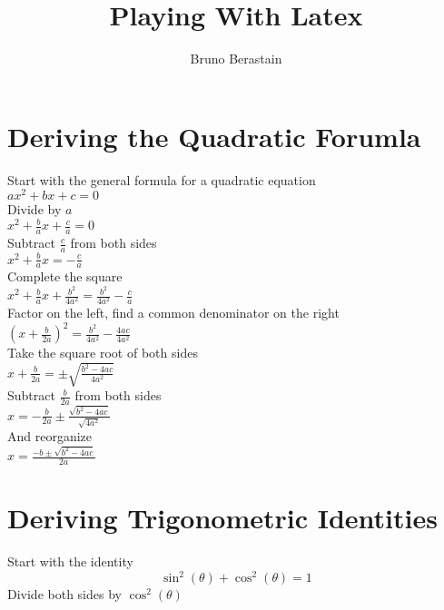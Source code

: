 \documentclass{article}
\author{Bruno Berastain}
\begin{document}
\title{Playing With Latex}
\maketitle

\section{Deriving the Quadratic Forumla}
	Start with the general formula for a quadratic equation\\
	
	\(ax^2 +bx+c = 0\)\\

	Divide by \(a\)\\

	\(x^2 + \frac{b}{a}x + \frac{c}{a} = 0\)\\

	Subtract \(\frac{c}{a}\) from both sides\\

	\(x^2 + \frac{b}{a}x = -\frac{c}{a}\)\\

	Complete the square\\

	\(x^2 + \frac{b}{a}x + \frac{b^2}{4a^2} = \frac{b^2}{4a^2} - \frac{c}{a}\)\\

	Factor on the left, find a common denominator on the right\\

	\((x + \frac{b}{2a})^2 = \frac{b^2}{4a^2} - \frac{4ac}{4a^2}\)\\

	Take the square root of both sides\\

	\(x + \frac{b}{2a} = \pm\sqrt{\frac{b^2 - 4ac}{4a^2}}\)\\

	Subtract \(\frac{b}{2a}\) from both sides\\

	\(x = -\frac{b}{2a} \pm\frac{\sqrt{b^2 - 4ac}}{\sqrt{4a^2}}\)\\

	And reorganize\\

	\(x = \frac{-b \pm \sqrt{b^2 - 4ac}}{2a}\)\\

\section{Deriving Trigonometric Identities}
	Start with the identity\\
\begin{equation}
	\sin^2(\theta) + \cos^2(\theta) = 1
\end{equation}	
	Divide both sides by \(\cos^2(\theta)\)\\
\end{document}
